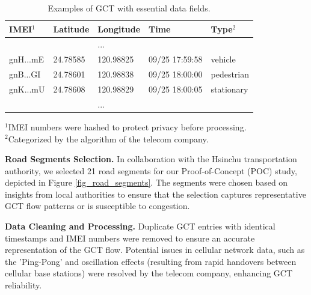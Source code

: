 \documentclass[letterpaper]{article} %
\begin{document}
\begin{table}[h]
  \small

  \begin{tabular}{p{1.0cm}p{1.0cm}p{1.2cm}p{1.95cm}p{1.1cm}}
    \hline
    \textbf{IMEI$^{1}$} &  \textbf{Latitude} &  \textbf{Longitude} &  \textbf{Time} &  \textbf{Type$^{2}$}  \\
    \hline
     &   & ... &   &   \\
    gnH...mE & 24.78585 & 120.98825 & 09/25 17:59:58 &  vehicle \\
    gnB...GI & 24.78601 & 120.98838 & 09/25 18:00:00 & pedestrian \\
    gnK...mU & 24.78608 & 120.98829 & 09/25 18:00:05 & stationary \\
     &   & ... &   &   \\
    \hline
  \end{tabular}
  \scriptsize
  $^{1}$IMEI numbers were hashed to protect privacy before processing. \\
  $^{2}$Categorized by the algorithm of the telecom company.
  \caption{Examples of GCT with essential data fields.}
  \label{tab:raw_table}
\end{table}

\noindent \textbf{Road Segments Selection.}
In collaboration with the Hsinchu transportation authority, we selected 21 road segments for our Proof-of-Concept (POC) study, depicted in Figure \ref{fig_road_segments}. The segments were chosen based on insights from local authorities to ensure that the selection captures representative GCT flow patterns or is susceptible to congestion.

\noindent \textbf{Data Cleaning and Processing.}
Duplicate GCT entries with identical timestamps and IMEI numbers were removed to ensure an accurate representation of the GCT flow. Potential issues in cellular network data, such as the 'Ping-Pong' and oscillation effects \cite{zidic2023analyses} (resulting from rapid handovers between cellular base stations) were resolved by the telecom company, enhancing GCT reliability.
\end{document}
